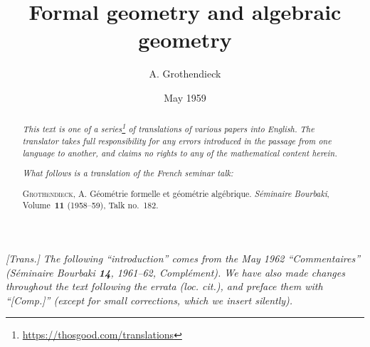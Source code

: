 \documentclass{article}
\title{Formal geometry and algebraic geometry}
\author{A. Grothendieck}
\date{May 1959}
\newcommand{\doctype}{French seminar talk}
\newcommand{\origcit}{%
  \textsc{Grothendieck, A.}
  G\'{e}om\'{e}trie formelle et g\'{e}om\'{e}trie alg\'{e}brique.
  \emph{S\'{e}minaire Bourbaki}, Volume~\textbf{11} (1958--59), Talk no.~182.%
}
\begin{document}
\maketitle
\thispagestyle{fancy}

\renewcommand{\abstractname}{Translator's note.}

\begin{abstract}
  \renewcommand*{\thefootnote}{\fnsymbol{footnote}}
  \emph{This text is one of a series\footnote{\url{https://thosgood.com/translations}} of translations of various papers into English.}
  \emph{The translator takes full responsibility for any errors introduced in the passage from one language to another, and claims no rights to any of the mathematical content herein.}

  \medskip
  
  \emph{What follows is a translation of the \doctype:}

  \medskip\noindent
  \origcit
\end{abstract}

\setcounter{footnote}{0}

\tableofcontents



\section*{}

\emph{[Trans.] The following ``introduction'' comes from the May 1962 ``Commentaires'' (\emph{S\'{e}minaire Bourbaki} \textbf{14}, 1961--62, Compl\'{e}ment). We have also made changes throughout the text following the errata (loc. cit.), and preface them with ``[Comp.]'' (except for small corrections, which we insert silently).}
\end{document}
